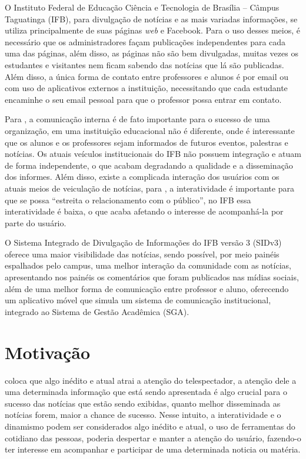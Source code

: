 O Instituto Federal de Educação Ciência e Tecnologia de Brasília -- Câmpus Taguatinga (IFB), para divulgação de notícias e as mais variadas informações, se utiliza principalmente de suas páginas \textit{web} e Facebook. Para o uso desses meios, é necessário que os administradores façam publicações independentes para cada uma das páginas, além disso, as páginas não são bem divulgadas, muitas vezes os estudantes e visitantes nem ficam sabendo das notícias que lá são publicadas. Além disso, a única forma de contato entre professores e alunos é por email ou com uso de aplicativos externos a instituição, necessitando que cada estudante encaminhe o seu email pessoal para que o professor possa entrar em contato.

Para \citet{pinheiro2010}, a comunicação interna é de fato importante para o sucesso de uma organização, em uma instituição educacional não é diferente, onde é interessante que os alunos e os professores sejam informados de futuros eventos, palestras e notícias. Os atuais veículos institucionais do IFB não possuem integração e atuam de forma independente, o que acabam degradando a qualidade e a disseminação dos informes. Além disso, existe a complicada interação dos usuários com os atuais meios de veiculação de notícias, para \citet{santos2014}, a interatividade é importante para que se possa ``estreita o relacionamento com o público'', no IFB essa interatividade é baixa, o que acaba afetando o interesse de acompanhá-la por parte do usuário.

O Sistema Integrado de Divulgação de Informações do IFB versão 3 (SIDv3) oferece uma maior visibilidade das notícias, sendo possível, por meio painéis espalhados pelo campus, uma melhor interação da comunidade com as notícias, apresentando nos painéis os comentários que foram publicados nas mídias sociais, além de uma melhor forma de comunicação entre professor e aluno, oferecendo um aplicativo móvel que simula um sistema de comunicação institucional, integrado ao Sistema de Gestão Acadêmica (SGA).

\section{Motivação}
\citet{bianchi2006} coloca que algo inédito e atual atrai a atenção do telespectador, a atenção dele a uma determinada informação que está sendo apresentada é algo crucial para o sucesso das notícias que estão sendo exibidas, quanto melhor disseminada as notícias forem, maior a chance de sucesso. Nesse intuito, a interatividade e o dinamismo podem ser considerados algo inédito e atual, o uso de ferramentas do cotidiano das pessoas, poderia despertar e manter a atenção do usuário, fazendo-o ter interesse em acompanhar e participar de uma determinada noticia ou matéria.


